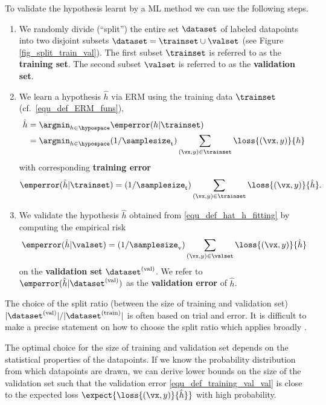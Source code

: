 \documentclass[12pt]{report}
\begin{document}
To validate the hypothesis learnt by a ML method we can use the following steps. 
\begin{enumerate} 
\item We randomly divide (``split'') the entire set $\dataset$ of labeled datapoints into 
two disjoint subsets $\dataset = \trainset \cup \valset$ (see Figure \ref{fig_split_train_val}). 
The first subset $\trainset$ is referred to as the {\bf training set}. The second subset $\valset$ 
is referred to as the {\bf validation set}.  
\item We learn a hypothesis $\hat{h}$ via ERM using the training data $\trainset$ (cf.\ \eqref{equ_def_ERM_funs}), 
\begin{align} 
\label{equ_def_hat_h_fitting}
\hat{h} & = \argmin_{h \in \hypospace} \emperror(h| \trainset) \nonumber \\
& = \argmin_{h \in \hypospace}  (1/\samplesize_{\rm t}) \sum_{(\vx,y) \in \trainset} \loss{(\vx,y)}{h} %
\end{align} 
with corresponding {\bf training error} 
\begin{equation} 
\label{equ_def_training_error_val}
\emperror(\hat{h}|\trainset)=  (1/\samplesize_{\rm t})\sum_{(\vx,y) \in \trainset}  \loss{(\vx,y)} {\hat{h}}.  %
\end{equation}  
\item We validate the hypothesis $\hat{h}$ obtained from \eqref{equ_def_hat_h_fitting} by computing the empirical risk 
\begin{equation} 
\label{equ_def_training_val_val}
\emperror(\hat{h}|\valset) = (1/\samplesize_{\rm v})  \sum_{(\vx,y) \in \valset} \loss{(\vx,y)} {\hat{h}}  %
\end{equation}  
on the {\bf validation set} $\dataset^{(\rm val)}$. We refer to $\emperror(\hat{h}| \dataset^{(\rm val)})$ 
as the {\bf validation error} of $\hat{h}$. 
\end{enumerate} 
The choice of the split ratio (between the size of training and validation set) $|\dataset^{(\rm val)}| / |\dataset^{(\rm train)}|$ 
is often based on trial and error. It is difficult to make a precise statement on 
how to choose the split ratio which applies broadly \cite{Larsen1999}. 

The optimal choice for the size of training and validation set depends on the 
statistical properties of the datapoints. If we know the probability distribution 
from which datapoints are drawn, we can derive lower bounds on the size of 
the validation set such that the validation error \eqref{equ_def_training_val_val} 
is close to the expected loss $\expect\{ \loss{(\vx,y)} {\hat{h}} \}$ with high probability. 
 
\end{document}
